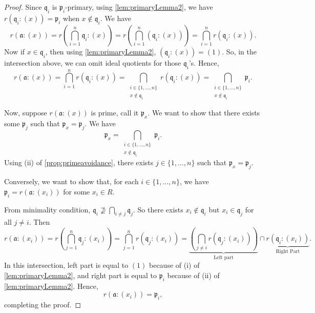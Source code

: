 \begin{proof}
  Since \( \mathfrak{q}_i \) is \( \mathfrak{p}_i \)-primary, using \autoref{lem:primaryLemma2}, we have \( r(\mathfrak{q}_i: (x)) = \mathfrak{p}_i\) when \( x \not\in \mathfrak{q}_i \).
    We have 
    \[
    r(\mathfrak{a} : (x)) = r\left(\bigcap_{i=1}^n \mathfrak{q}_i : (x) \right) = r\left(\bigcap_{i=1}^n (\mathfrak{q}_i : (x)) \right) = \bigcap_{i=1}^n r(\mathfrak{q}_i : (x)).
    \]
    Now if \( x \in \mathfrak{q}_i \), then using \autoref{lem:primaryLemma2}, \( (\mathfrak{q}_i : (x)) = (1) \). So, in the intersection above, we can omit ideal quotients for those \( \mathfrak{q}_i \)'s. Hence,
    \[
      r(\mathfrak{a}: (x)) = \bigcap_{i=1}^n r(\mathfrak{q}_i : (x)) = \bigcap_{\substack{i\in\{1, \ldots, n\}\\x \not\in \mathfrak{q}_i}} r(\mathfrak{q}_i : (x)) = \bigcap_{\substack{i\in\{1, \ldots, n\}\\x \not\in \mathfrak{q}_i}}  \mathfrak{p}_i.
    \]

    Now, suppose \( r(\mathfrak{a}: (x)) \) is prime, call it \( \mathfrak{p}_x \). We want to show that there exists some \( \mathfrak{p}_j \) such that \( \mathfrak{p}_x = \mathfrak{p}_j \). We have 
    \[
    \mathfrak{p}_x = \bigcap_{\substack{i\in\{1, \ldots, n\}\\x \not\in \mathfrak{q}_i}} \mathfrak{p}_i.
    \]
    Using (ii) of \autoref{prop:primeavoidance}, there exists \( j \in \{1, \ldots, n\} \) such that \( \mathfrak{p}_x = \mathfrak{p}_j \).

    Conversely, we want to show that, for each \( i \in \{1, \ldots, n\} \), we have \( \mathfrak{p}_i = r(\mathfrak{a}: (x_i)) \) for some \( x_i \in R \).

    From minimality condition, \( \mathfrak{q}_i \not\supseteq \bigcap_{i \neq j} \mathfrak{q}_j \). So there exists \( x_i \not\in \mathfrak{q}_i \) but \( x_i \in \mathfrak{q}_j \) for all \( j \neq i \). Then
     \[
       r(\mathfrak{a}: (x_i)) = r\left(\bigcap_{j = 1}^n \mathfrak{q}_j: (x_i)\right) = \bigcap_{j=1}^n r(\mathfrak{q}_j : (x_i)) = \underbrace{\left(\bigcap_{j \neq i} r(\mathfrak{q}_j: (x_i))\right)}_{\text{Left part}} \cap \underbrace{r(\mathfrak{q}_i : (x_i))}_{\text{Right Part}}. 
    \]
    In this intersection, left part is equal to \( (1) \) because of (i) of \autoref{lem:primaryLemma2}, and right part is equal to \( \mathfrak{p}_i \) because of (ii) of \autoref{lem:primaryLemma2}. Hence, 
    \[
    r(\mathfrak{a}: (x_i)) = \mathfrak{p}_i,
    \]
    completing the proof.
\end{proof}
